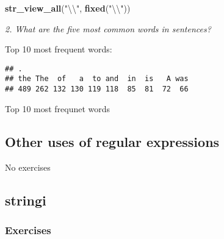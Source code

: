\documentclass[]{article}
\newenvironment{Shaded}{\begin{snugshade}}{\end{snugshade}}
\newcommand{\KeywordTok}[1]{\textcolor[rgb]{0.13,0.29,0.53}{\textbf{#1}}}
\newcommand{\DataTypeTok}[1]{\textcolor[rgb]{0.13,0.29,0.53}{#1}}
\newcommand{\DecValTok}[1]{\textcolor[rgb]{0.00,0.00,0.81}{#1}}
\newcommand{\CharTok}[1]{\textcolor[rgb]{0.31,0.60,0.02}{#1}}
\newcommand{\StringTok}[1]{\textcolor[rgb]{0.31,0.60,0.02}{#1}}
\newcommand{\OtherTok}[1]{\textcolor[rgb]{0.56,0.35,0.01}{#1}}
\newcommand{\OperatorTok}[1]{\textcolor[rgb]{0.81,0.36,0.00}{\textbf{#1}}}
\newcommand{\NormalTok}[1]{#1}
\theoremstyle{definition}
\theoremstyle{definition}
\theoremstyle{definition}
\theoremstyle{remark}
\begin{document}
\hypertarget{htmlwidget-aea203b03d9028d97b13}{}

\begin{Shaded}
\begin{Highlighting}[]
\KeywordTok{str_view_all}\NormalTok{(}\StringTok{"}\CharTok{\textbackslash{}\textbackslash{}}\StringTok{"}\NormalTok{, }\KeywordTok{fixed}\NormalTok{(}\StringTok{"}\CharTok{\textbackslash{}\textbackslash{}}\StringTok{"}\NormalTok{))}
\end{Highlighting}
\end{Shaded}

\hypertarget{htmlwidget-09c3d816dfd9f92ba359}{}

\emph{2. What are the five most common words in sentences?}

Top 10 most frequent words:

\begin{Shaded}
\end{Shaded}

\begin{verbatim}
## .
## the The  of   a  to and  in  is   A was 
## 489 262 132 130 119 118  85  81  72  66
\end{verbatim}

Top 10 most frequnet words

\subsection{Other uses of regular
expressions}\label{other-uses-of-regular-expressions}

No exercises

\subsection{stringi}\label{stringi}

\subsubsection{Exercises}\label{exercises-37}
\end{document}
